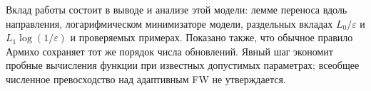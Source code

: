 Вклад работы состоит в выводе и анализе этой модели: лемме переноса
вдоль направления, логарифмическом минимизаторе модели, раздельных
вкладах $L_0/\varepsilon$ и $L_1\log(1/\varepsilon)$ и проверяемых
примерах. Показано также, что обычное правило Армихо сохраняет тот же
порядок числа обновлений. Явный шаг экономит пробные вычисления
функции при известных допустимых параметрах; всеобщее численное
превосходство над адаптивным FW не утверждается.
